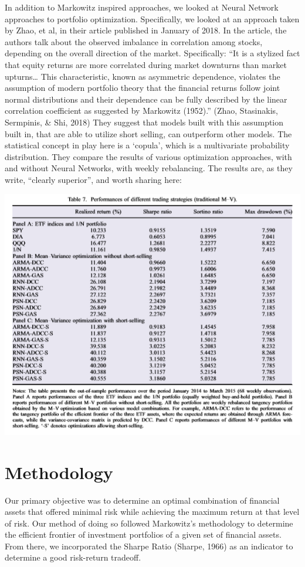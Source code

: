 \documentclass[11pt]{article} %
\begin{document}
In addition to Markowitz inspired approaches, we looked at Neural Network approaches to portfolio optimization. Specifically, we looked at an approach taken by Zhao, et al, in their article published in January of 2018. In the article, the authors talk about the observed imbalance in correlation among stocks, depending on the overall direction of the market. Specifically: ``It is a stylized fact that equity returns are more correlated during market downturns than market upturns… This characteristic, known as asymmetric dependence, violates the assumption of modern portfolio theory that the financial returns follow joint normal distributions and their dependence can be fully described by the linear correlation coefficient as suggested by Markowitz (1952).” (Zhao, Stasinakis, Sermpinis, \& Shi, 2018) They suggest that models built with this assumption built in, that are able to utilize short selling, can outperform other models. The statistical concept in play here is a ‘copula’, which is a multivariate probability distribution. They compare the results of various optimization approaches, with and without Neural Networks, with weekly rebalancing. The results are, as they write, ``clearly superior”, and worth sharing here:

\includegraphics[width=\textwidth]{table1}

 
\section{Methodology}

Our primary objective was to determine an optimal combination of financial assets that offered minimal risk while achieving the maximum return at that level of risk. Our method of doing so followed Markowitz’s methodology to determine the efficient frontier of investment portfolios of a given set of financial assets. From there, we incorporated the Sharpe Ratio (Sharpe, 1966) as an indicator to determine a good risk-return tradeoff.
\end{document}

